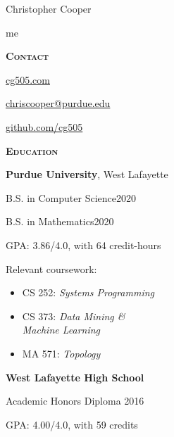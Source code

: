 \documentclass[11pt]{article}
\newcommand{\sectionfont}{\Large\scshape\bfseries\color{cg505green}}
\begin{document}
\begin{centering}
  \fontsize{40pt}{50pt}\selectfont
  \color{cg505green}
  Christopher Cooper

\end{centering}

\vspace{10pt}

\begin{minipage}[t]{0.3\textwidth}
  {\Huge\color{black} me \phantom{my work}}

  \vspace{5pt}

  {\sectionfont Contact}
  \begin{adjustwidth}{10pt}{}
    \href{https://cg505.com/}{cg505.com}

    \href{mailto:chriscooper@purdue.edu}{chriscooper@purdue.edu}

    \href{https://github.com/cg505/}{github.com/cg505}
  \end{adjustwidth}

  \vspace{5pt}

  {\sectionfont Education}

  \textbf{Purdue University}, West Lafayette
  \begin{adjustwidth}{10pt}{}
    B.S. in Computer Science\hfill2020

    B.S. in Mathematics\hfill2020

    GPA: 3.86/4.0, with 64 credit-hours

    Relevant coursework:
    \begin{itemize}[leftmargin=*]
    \item CS 252: \emph{Systems Programming}
    \item CS 373: \emph{Data Mining \&}\\\phantom{CS 373:} \emph{Machine Learning}
    \item MA 571: \emph{Topology}
    \end{itemize}
  \end{adjustwidth}

  \textbf{West Lafayette High School}
  \begin{adjustwidth}{10pt}{}
    Academic Honors Diploma \hfill2016

    GPA: 4.00/4.0, with 59 credits
  \end{adjustwidth}

  \vspace{5pt}


\end{minipage}
\end{document}
